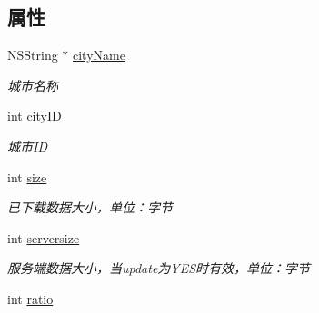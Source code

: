 \subsection*{属性}
\begin{DoxyCompactItemize}
\item 
\hypertarget{interface_b_m_k_o_l_update_element_acf8998f896d5eee3bf25b5efaf316ffa}{N\+S\+String $\ast$ \hyperlink{interface_b_m_k_o_l_update_element_acf8998f896d5eee3bf25b5efaf316ffa}{city\+Name}}\label{interface_b_m_k_o_l_update_element_acf8998f896d5eee3bf25b5efaf316ffa}

\begin{DoxyCompactList}\small\item\em 城市名称 \end{DoxyCompactList}\item 
\hypertarget{interface_b_m_k_o_l_update_element_a0fc2ac335466b2fb891d1c3c430e14db}{int \hyperlink{interface_b_m_k_o_l_update_element_a0fc2ac335466b2fb891d1c3c430e14db}{city\+I\+D}}\label{interface_b_m_k_o_l_update_element_a0fc2ac335466b2fb891d1c3c430e14db}

\begin{DoxyCompactList}\small\item\em 城市\+I\+D \end{DoxyCompactList}\item 
\hypertarget{interface_b_m_k_o_l_update_element_a64207ce9d00c3127b02fbeaeb2dfc49c}{int \hyperlink{interface_b_m_k_o_l_update_element_a64207ce9d00c3127b02fbeaeb2dfc49c}{size}}\label{interface_b_m_k_o_l_update_element_a64207ce9d00c3127b02fbeaeb2dfc49c}

\begin{DoxyCompactList}\small\item\em 已下载数据大小，单位：字节 \end{DoxyCompactList}\item 
\hypertarget{interface_b_m_k_o_l_update_element_ad61b9f37f09ee7c2c2c41570c1329d1e}{int \hyperlink{interface_b_m_k_o_l_update_element_ad61b9f37f09ee7c2c2c41570c1329d1e}{serversize}}\label{interface_b_m_k_o_l_update_element_ad61b9f37f09ee7c2c2c41570c1329d1e}

\begin{DoxyCompactList}\small\item\em 服务端数据大小，当update为\+Y\+E\+S时有效，单位：字节 \end{DoxyCompactList}\item 
\hypertarget{interface_b_m_k_o_l_update_element_a8f26b0d8b91573b17f2314fe5795dcd4}{int \hyperlink{interface_b_m_k_o_l_update_element_a8f26b0d8b91573b17f2314fe5795dcd4}{ratio}}\label{interface_b_m_k_o_l_update_element_a8f26b0d8b91573b17f2314fe5795dcd4}


\end{DoxyCompactItemize}
